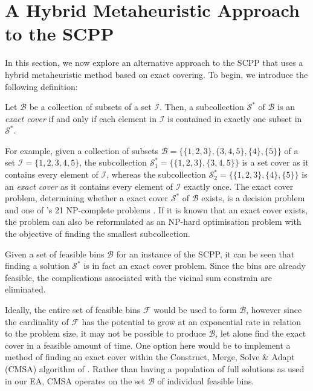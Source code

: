 \documentclass[authoryear]{elsarticle}
\begin{document}
\section{A Hybrid Metaheuristic Approach to the SCPP}
\label{sec:cmsa}
\noindent In this section, we now explore an alternative approach to the SCPP that uses a hybrid metaheuristic method based on exact covering. To begin, we introduce the following definition:

\begin{definition}
	\label{defn:exactcover}
	Let $\mathcal{B}$ be a collection of subsets of a set $\mathcal{I}$. Then, a subcollection $\mathcal{S}^*$ of $\mathcal{B}$ is an \emph{exact cover} if and only if each element in $\mathcal{I}$ is contained in exactly one subset in $\mathcal{S}^*$.
\end{definition}	

\noindent For example, given a collection of subsets $\mathcal{B} = \{\{1,2,3\}, \{3,4,5\}, \{4\}, \{5\}\}$ of a set $\mathcal{I} = \{1,2,3,4,5\}$, the subcollection $\mathcal{S}^*_1 = \{\{1,2,3\}, \{3,4,5\}\}$ is a set cover as it contains every element of $\mathcal{I}$, whereas the subcollection $\mathcal{S}^*_2 = \{\{1,2,3\}, \{4\}, \{5\}\}$ is an \emph{exact cover} as it contains every element of $\mathcal{I}$ exactly once. The exact cover problem, determining whether a exact cover $\mathcal{S}^*$ of $\mathcal{B}$ exists, is a decision problem and one of \citeauthor{karp1972}'s 21 NP-complete problems \citeyearpar{karp1972}. If it is known that an exact cover exists, the problem can also be reformulated as an NP-hard optimisation problem with the objective of finding the smallest subcollection.

Given a set of feasible bins $\mathcal{B}$ for an instance of the SCPP, it can be seen that finding a solution $\mathcal{S}^*$ is in fact an exact cover problem. Since the bins are already feasible, the complications associated with the vicinal sum constrain are eliminated.

Ideally, the entire set of feasible bins $\mathcal{F}$ would be used to form $\mathcal{B}$, however since the cardinality of $\mathcal{F}$ has the potential to grow at an exponential rate in relation to the problem size, it may not be possible to produce $\mathcal{B}$, let alone find the  exact cover in a feasible amount of time. One option here would be to implement a method of finding  an exact cover within the Construct, Merge, Solve \& Adapt (CMSA) algorithm of \citet{blum2016}. Rather than having a population of full solutions as used in our EA, CMSA operates on the set $\mathcal{B}$ of individual feasible bins.
\end{document}
